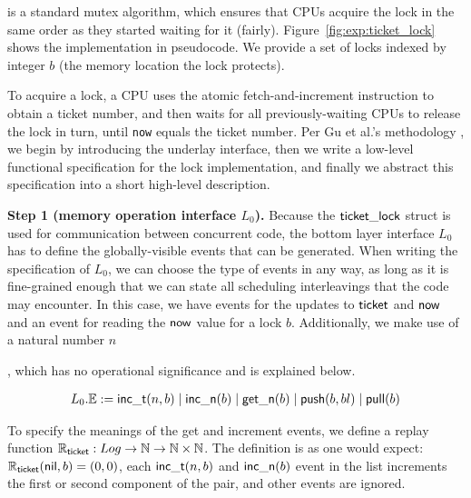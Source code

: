 is a standard mutex algorithm, which ensures that CPUs acquire the
lock in the same order as they started waiting for it (fairly).
Figure~\ref{fig:exp:ticket_lock} shows the implementation in
pseudocode. We provide a set of locks indexed by integer $b$
(the memory location the lock protects). 
 To acquire a lock, a CPU uses the atomic
fetch-and-increment instruction to obtain a ticket number, and then waits
for all previously-waiting CPUs to release the lock in turn, until
{\tt now} equals the ticket number.
Per Gu et al.'s methodology \cite{dscal15}, we begin by 
introducing the underlay interface,
then we write a
low-level functional specification for the lock implementation,
and finally we abstract this specification into a short
high-level description.
\vspace{3pt}

\noindent\textbf{Step 1 (memory operation interface $L_0$).}
Because the $\comm{ticket\_lock}$ struct is used for communication
between concurrent code, 
the bottom layer interface $L_0$
has to define the globally-visible events that can be generated. 
When writing the specification of $L_0$,  we can choose the type of events in any way, as long
as it is 
fine-grained enough that we can state all scheduling interleavings that
the code may encounter. In this case, we have events for the updates to
$\ticket$ and $\now$ and an event for reading the $\now$ value
for a lock $b$. Additionally, we make use of a natural number 
$n$, which has no
operational significance and is explained below.
\begin{small} 
\[
\begin{array}{c}
L_0.\Ev := \incticket(n, b) \mid \incnow(b) \mid \getnow(b)
\mid \push(b,bl) \mid \pull(b)
\ignore{\\
&  \mid &  \holdlock \mid \tshared (e : \mathsf{SharedMemEvent})}
\end{array}
\] 
\vspace{-10pt}
\end{small}%

To specify the meanings of the get and increment events, we define a replay
function $\replay_{\comm{ticket}} : Log \to \integer \to \integer\times \integer$. 
The definition is as one would expect:
$\replay_{\comm{ticket}}(\mathsf{nil}, b) = (0,0)$, each 
$\incticket(n, b)$ and $\incnow(b)$ event in the list increments
the first or second component of the pair, and other events are ignored.

